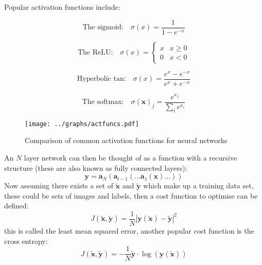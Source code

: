      Popular activation functions include:
      \begin{multicols}{2}


        \begin{equation}
          \text{The sigmoid:}\quad
          \sigma (x) = \frac{1}{1-e^{-x}} \label{eq:sigmoid}
        \end{equation}


        \begin{equation}
          \text{The ReLU:}\quad
          \sigma(x) =
          \begin{cases}
            x & x\geq 0 \\
            0 & x < 0
          \end{cases}
        \end{equation}


        \begin{equation}
          \text{Hyperbolic tan:}\quad
          \sigma(x)=\frac{e^x - e^{-x}}{e^x + e^{-x}}
        \end{equation}


        \begin{equation}
          \text{The softmax:}\quad
          \sigma(\mathbf{x})_j = \frac{e^{x_j}}{\sum_i e^{x_i}}
        \end{equation}


      \end{multicols}

      \begin{figure} \label{disfagraph}
        \center
        \texttt{[image: ../graphs/actfuncs.pdf]}
        \caption{Comparison of common activation functions for neural networks}
      \end{figure}



      An $N$ layer network can
      then be thought of as a function with a recursive structure (these are also known as fully connected layers):
      \begin{equation}
        \mathbf{y} = \mathbf{a}_{N}(\mathbf{a}_{l-1}(...\mathbf{a}_1(\mathbf{x})...))
      \end{equation}
      Now assuming there exists a set of $\tilde{\mathbf{x}}$ and $\tilde{\mathbf{y}}$ which make
      up a training data set, these could be sets of images and labels, then a cost function
      to optimise can be defined:
      \begin{equation}
        J(\tilde{\mathbf{x}},\tilde{\mathbf{y}}) = \frac{1}{N}\left |\mathbf{y}(\tilde{\mathbf{x}})-\tilde{\mathbf{y}}\right | ^2
      \end{equation}
      this is called the least mean squared error, another popular cost function is
      the cross entropy:
      \begin{equation}
        J(\tilde{\mathbf{x}},\tilde{\mathbf{y}}) = -\frac{1}{N}\tilde{\mathbf{y}}\cdot\log(\mathbf{y}(\tilde{\mathbf{x}}))
      \end{equation}

